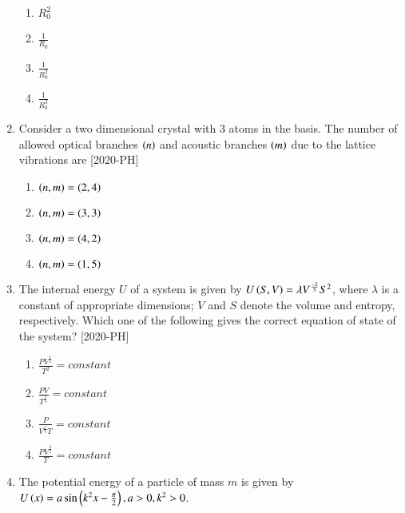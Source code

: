 \documentclass[journal]{IEEEtran}
\begin{document}
\begin{enumerate}[start=40]
\begin{enumerate}
    \item $R_{0}^2$\\
    \item $\frac{1}{R_0}$\\
    \item $\frac{1}{R_0 ^2}$\\
    \item $\frac{1}{R_0 ^3}$\\
\end{enumerate}
\item Consider a two dimensional crystal with 3 atoms in the basis. The number of allowed optical branches $\left(n\right)$ and acoustic branches $\left(m\right)$ due to the lattice vibrations are \hfill{[2020-PH]}\\
\begin{enumerate}
    \item $\left(n, m\right)=\left(2, 4\right)$
    \item $\left(n, m\right)=\left(3, 3\right)$
    \item $\left(n, m\right)=\left(4, 2\right)$
    \item $\left(n, m\right)=\left(1, 5\right)$
\end{enumerate}
\item The internal energy $U$ of a system is given by $U\left(S,V\right)=\lambda V^ \frac{-2}{3} S^2$, where $\lambda$ is a constant of appropriate dimensions; $V$ and $S$ denote the volume and entropy, respectively. Which one of the following gives the correct equation of state of the system? \hfill{[2020-PH]}\\
\begin{enumerate}
    \item $\frac{PV^ \frac{1}{3}}{T^2}=constant$\\
    \item $\frac{PV}{T^ \frac{1}{3}}=constant$\\
    \item $\frac{P}{V^ \frac{1}{3}T}=constant$\\
    \item $\frac{PV^ \frac{2}{3}}{T}=constant$\\
\end{enumerate}
\item The potential energy of a particle of mass $m$ is given by \\
$U \left(x\right)=a\sin \left(k^2 x-\frac{\pi}{2}\right), a>0, k^2>0$.\\


\end{enumerate}
\end{document}
